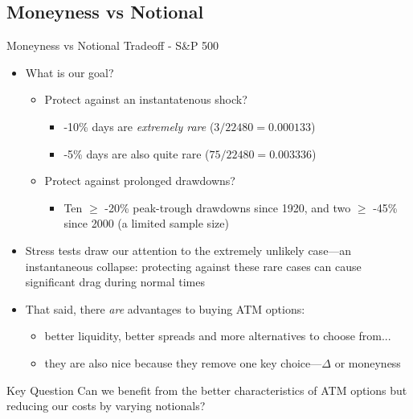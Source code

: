 \documentclass{beamer}
\begin{document}
\subsection{Moneyness vs Notional}
\begin{frame}{Moneyness vs Notional Tradeoff - S\&P 500}

\begin{itemize}
\item What is our goal? 
	\begin{itemize}
	\item Protect against an instantatenous shock? 
	\begin{itemize}
	\item -10\% days are {\em extremely rare} ($3/22480=0.000133$)  
	\item -5\% days are also quite rare ($75/22480=0.003336$)
	\end{itemize}
	\item Protect against prolonged drawdowns? 
	\begin{itemize} \item Ten $\ge$ -20\%  peak-trough drawdowns since 1920, and two $\ge$ -45\%  since 2000 (a limited sample size)\end{itemize}
	\end{itemize}
\item Stress tests draw our attention to the extremely unlikely case---an instantaneous collapse: protecting against these rare cases can cause significant drag during normal times

\item That said, there {\em are} advantages to buying ATM options: 
\begin{itemize}
\item better liquidity, better spreads and more alternatives to choose from...
\item they are also nice because they remove one key choice---$\Delta$ or moneyness
\end{itemize}

\end{itemize}
\begin{block}{Key Question}
Can we benefit from the better characteristics of ATM options but reducing our costs by varying notionals?
\end{block}

\end{frame}
\end{document}
